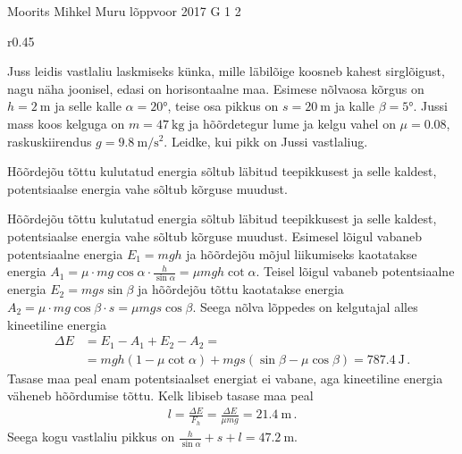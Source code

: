 {Moorits Mihkel Muru} %
{lõppvoor} %
{2017} %
{G 1} %
{2} %
{
\ifStatement
\begin{wrapfigure}[5]{r}{0.45\linewidth}
	\vspace{-5pt}
\end{wrapfigure}

Juss leidis vastlaliu laskmiseks künka, mille läbilõige koosneb kahest sirglõigust, nagu näha joonisel, edasi on horisontaalne maa. Esimese nõlvaosa kõrgus on \(h=\SI{2}{\meter}\) ja selle kalle \(\alpha=\ang{20}\), teise osa pikkus on \(s=\SI{20}{\meter}\) ja kalle \(\beta=\ang{5}\). Jussi mass koos kelguga on \(m=\SI{47}{\kilogram}\) ja hõõrdetegur lume ja kelgu vahel on \(\mu=\num{0.08}\), raskuskiirendus \(g=\SI{9.8}{\meter\per\second\squared}\). Leidke, kui pikk on Jussi vastlaliug.
\fi


\ifHint
Hõõrdejõu tõttu kulutatud energia sõltub läbitud teepikkusest ja selle kaldest, potentsiaalse energia vahe sõltub kõrguse muudust.
\fi


\ifSolution
Hõõrdejõu tõttu kulutatud energia sõltub läbitud teepikkusest ja selle kaldest, potentsiaalse energia vahe sõltub kõrguse muudust. Esimesel lõigul vabaneb potentsiaalne energia \(E_1 = mgh\) ja hõõrdejõu mõjul liikumiseks kaotatakse energia \( A_1 = \mu \cdot mg\cos\alpha \cdot \frac{h}{\sin\alpha} = \mu mgh \cot\alpha \). Teisel lõigul vabaneb potentsiaalne energia \(E_2 = mgs \sin\beta\) ja hõõrdejõu tõttu kaotatakse energia \( A_2 = \mu \cdot mg \cos \beta \cdot s = \mu mgs \cos \beta \). Seega nõlva lõppedes on kelgutajal alles kineetiline energia
\begin{align*}
\Delta E &= E_1 - A_1 + E_2 - A_2 = \\
&= mgh(1-\mu\cot\alpha) + mgs(\sin\beta - \mu\cos\beta) =  \SI{787.4}{\joule} \, .
\end{align*}
Tasase maa peal enam potentsiaalset energiat ei vabane, aga kineetiline energia väheneb hõõrdumise tõttu. Kelk libiseb tasase maa peal
\begin{align*}
l = \frac{\Delta E}{F_h} = \frac{\Delta E}{\mu mg} = \SI{21.4}{\meter} \, .
\end{align*}
Seega kogu vastlaliu pikkus on \(\frac{h}{\sin\alpha} + s + l = \SI{47.2}{\meter}\).
\fi


}
